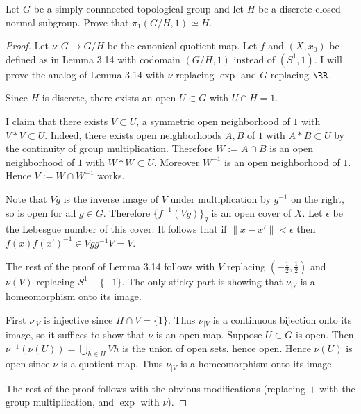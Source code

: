 \documentclass{article}
\begin{document}
 Let $G$ be a simply connnected topological group and let $H$ be a discrete closed
normal subgroup. Prove that $\pi_1(G/H, 1) \simeq H$.
\begin{proof}
Let $\nu: G \to G/H$ be the canonical quotient map. Let $f$ and $(X,x_0)$ be defined as in Lemma 3.14 with
codomain $(G/H,1)$ instead of $(S^1, 1)$. I will prove the analog of Lemma 3.14 with
$\nu$ replacing $\exp$ and $G$ replacing $\RR$.

Since $H$ is discrete, there exists an open $U \subset G$ with $U \cap H = 1$. 

I claim that there exists $V \subset U$, a symmetric open neighborhood of $1$ with $V*V \subset U$.
Indeed, there exists open neighborhoods $A,B$ of $1$ with $A*B \subset U$ by the continuity of 
group multiplication.  Therefore $W := A \cap B$ is an open neighborhood of $1$ with $W*W \subset U$.
Moreover $W^{-1}$ is an open neighborhood of $1$.  Hence $V:= W \cap W^{-1}$ works.

Note that $Vg$ is the inverse image of $V$ under multiplication by $g^{-1}$ on the right, so is open for all $g \in G$. 
Therefore $\{f^{-1}(Vg)\}_g$ is an open cover of $X$. Let $\epsilon$ be the Lebesgue number of this cover. It follows that if $\|x - x'\| < \epsilon$
then $f(x) f(x')^{-1} \in Vg g^{-1}V = V$.

The rest of the proof of Lemma 3.14 follows with $V$ replacing $(-\frac 1 2, \frac 1 2)$ and $\nu(V)$ replacing $S^1 - \{-1\}$. The only
sticky part is showing that $\nu_{|V}$ is a homeomorphism onto its image.

First $\nu_{|V}$ is injective since $H \cap V = \{1\}$. Thus $\nu_{|V}$ is a continuous bijection onto its image, so it suffices to show that
$\nu$ is an open map. Suppose $U \subset G$ is open. Then $\nu^{-1}(\nu(U)) = \bigcup_{h \in H} Vh$ is the union of open sets, hence open.
Hence $\nu(U)$ is open since $\nu$ is a quotient map.  Thus $\nu_{|V}$ is a homeomorphism onto its image.

The rest of the proof follows with the obvious modifications (replacing $+$ with the group multiplication, and $\exp$ with $\nu$).
\end{proof}

\end{document}
